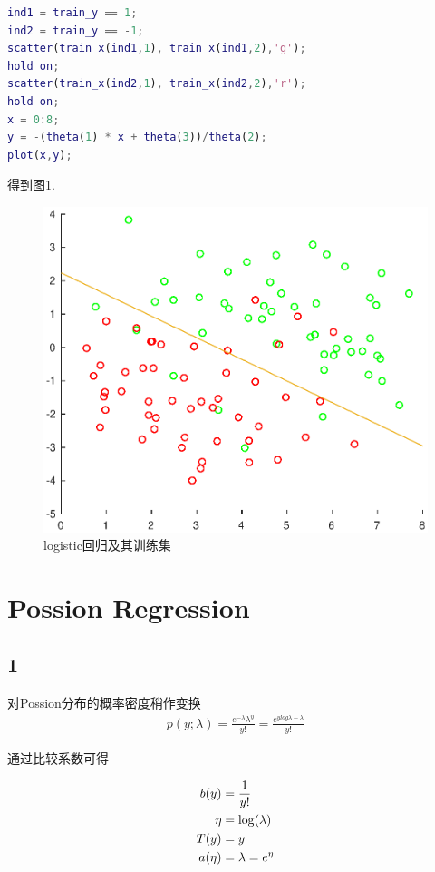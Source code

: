 \documentclass{ctexart}
\begin{document}
\begin{lstlisting}[language = MATLAB]
% draw the distribution of training data and the final model
ind1 = train_y == 1;
ind2 = train_y == -1;
scatter(train_x(ind1,1), train_x(ind1,2),'g');
hold on;
scatter(train_x(ind2,1), train_x(ind2,2),'r');
hold on;
x = 0:8;
y = -(theta(1) * x + theta(3))/theta(2);
plot(x,y);
\end{lstlisting}
得到图\ref{logistic}.

\begin{figure}[ht]
	\includegraphics[width = \textwidth]{logistic.eps}
	\caption{logistic回归及其训练集}
	\label{logistic}
\end{figure}

\section{Possion Regression}
\subsection{1}

对Possion分布的概率密度稍作变换
\begin{align}
	p(y;\lambda) = \frac{e^{-\lambda}\lambda^y}{y!} = \frac{e^{ylog\lambda-\lambda}}{y!}
\end{align}

通过比较系数可得

\begin{align}
	b(y) &= \frac{1}{y!} \notag \\
	\eta &= \log(\lambda) \notag \\
	T(y) &= y \notag \\
	a(\eta) &= \lambda = e^{\eta}  \notag
\end{align}
\end{document}
